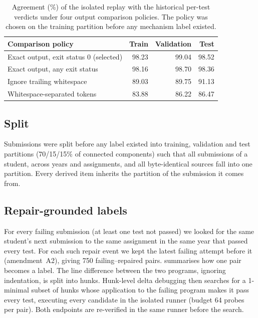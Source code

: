 \documentclass[a4paper,preprint,12pt,authoryear]{elsarticle}
\begin{document}
\begin{table}[t]
\centering
\caption{Agreement (\%) of the isolated replay with the historical per-test verdicts under four output comparison policies. The policy was chosen on the training partition before any mechanism label existed.}\label{tab:audit}
\small
\begin{tabular}{lrrr}
\toprule
Comparison policy & Train & Validation & Test \\
\midrule
Exact output, exit status 0 (selected) & 98.23 & 99.04 & 98.52 \\
Exact output, any exit status & 98.16 & 98.70 & 98.36 \\
Ignore trailing whitespace & 89.03 & 89.75 & 91.13 \\
Whitespace-separated tokens & 83.88 & 86.22 & 86.47 \\
\bottomrule
\end{tabular}
\end{table}

\subsection{Split}
Submissions were split before any label existed into training, validation and test partitions (70/15/15\% of connected components) such that all submissions of a student, across years and assignments, and all byte-identical sources fall into one partition. Every derived item inherits the partition of the submission it comes from.

\subsection{Repair-grounded labels}\label{sec:real}
For every failing submission (at least one test not passed) we looked for the same student's next submission to the same assignment in the same year that passed every test. For each such repair event we kept the latest failing attempt before it (amendment~A2), giving 750 failing--repaired pairs.  summarises how one pair becomes a label. The line difference between the two programs, ignoring indentation, is split into hunks. Hunk-level delta debugging \citep{zeller2002ddmin} then searches for a 1-minimal subset of hunks whose application to the failing program makes it pass every test, executing every candidate in the isolated runner (budget 64 probes per pair). Both endpoints are re-verified in the same runner before the search.
\end{document}
